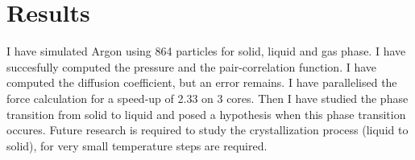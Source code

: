 \section{Results}
I have simulated Argon using 864 particles for solid, liquid and gas phase.
I have succesfully computed the pressure and the pair-correlation function. I
have computed the diffusion coefficient, but an error remains. I have
parallelised the force calculation for a speed-up of 2.33 on 3 cores. Then I
have studied the phase transition from solid to liquid and posed a hypothesis
when this phase transition occures.
Future research is required to study the crystallization process (liquid to
solid), for very small temperature steps are required.